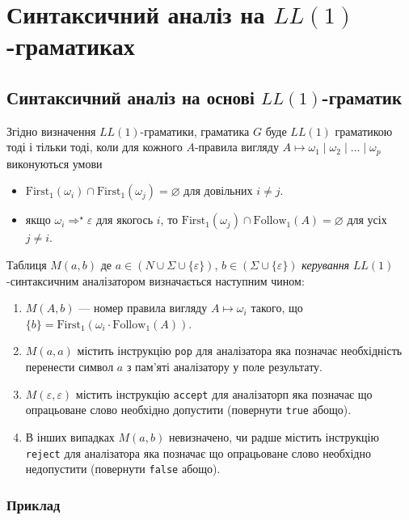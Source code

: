 \setcounter{section}{9}

\section{Синтаксичний аналіз на $LL(1)$-граматиках}

\subsection{Синтаксичний аналіз на основі $LL(1)$-граматик}

Згідно визначення $LL(1)$-граматики, граматика $G$ буде $LL(1)$ граматикою тоді і тільки тоді, коли для кожного $A$-правила вигляду $A \mapsto \omega_1 \mid \omega_2 \mid \ldots \mid \omega_p$ виконуються умови
\begin{itemize}
	\item $\text{First}_1 (\omega_i) \cap \text{First}_1 (\omega_j) = \varnothing$ для довільних $i \ne j$.
	\item якщо $\omega_i \Rightarrow^\star \varepsilon$ для якогось $i$, то $\text{First}_1(\omega_j) \cap \text{Follow}_1 (A) = \varnothing$ для усіх $j \ne i$.
\end{itemize}

Таблиця $M(a, b)$ де $a \in (N \cup \Sigma \cup \{\varepsilon\})$, $b \in (\Sigma \cup \{\varepsilon\})$ \textit{керування} $LL(1)$-синтаксичним аналізатором визначається наступним чином:
\begin{enumerate}
	\item $M(A, b)$ --- номер правила вигляду $A \mapsto \omega_i$ такого, що $\{b\} = \text{First}_1(\omega_i \cdot \text{Follow}_1 (A))$.
	\item $M(a, a)$ містить інструкцію \verb|pop| для аналізатора яка позначає необхідність перенести символ $a$ з пам'яті аналізатору у поле результату.
	\item $M(\varepsilon, \varepsilon)$ містить інструкцію \verb|accept| для аналізаторп яка позначає що опрацьоване слово необхідно допустити (повернути \verb|true| абощо).
	\item В інших випадках $M(a, b)$ невизначено, чи радше містить інструкцію \verb|reject| для аналізатора яка позначає що опрацьоване слово необхідно недопустити (повернути \verb|false| абощо).
\end{enumerate}

\subsubsection{Приклад}

